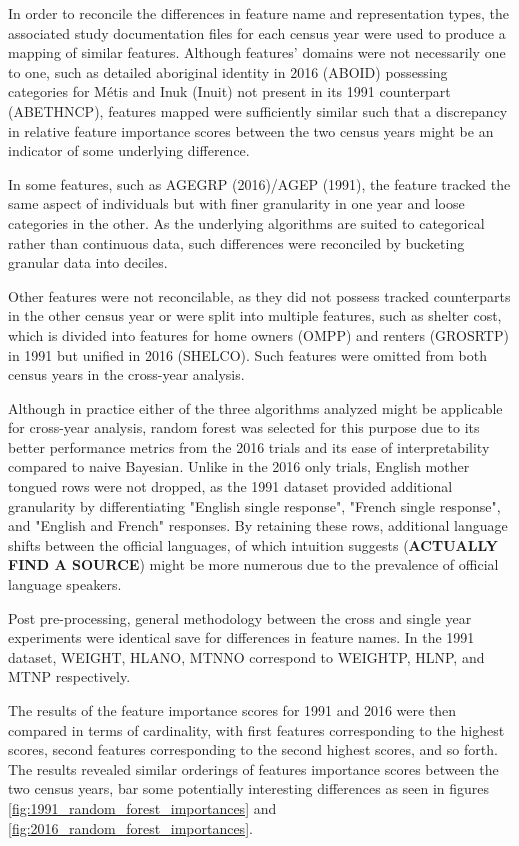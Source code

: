\documentclass[10pt, conference, compsocconf]{IEEEtran}
\begin{document}
In order to reconcile the differences in feature name and representation types, the associated study documentation files for each census year were used to produce a mapping of similar features.  Although features' domains were not necessarily one to one, such as detailed aboriginal identity in 2016 (ABOID) possessing categories for Métis and Inuk (Inuit) not present in its 1991 counterpart (ABETHNCP), features mapped were sufficiently similar such that a discrepancy in relative feature importance scores between the two census years might be an indicator of some underlying difference.

In some features, such as AGEGRP (2016)/AGEP (1991), the feature tracked the same aspect of individuals but with finer granularity in one year and loose categories in the other.  As the underlying algorithms are suited to categorical rather than continuous data, such differences were reconciled by bucketing granular data into deciles.

Other features were not reconcilable, as they did not possess tracked counterparts in the other census year or were split into multiple features, such as shelter cost, which is divided into features for home owners (OMPP) and renters (GROSRTP) in 1991 but unified in 2016 (SHELCO).  Such features were omitted from both census years in the cross-year analysis.

Although in practice either of the three algorithms analyzed might be applicable for cross-year analysis, random forest was selected for this purpose due to its better performance metrics from the 2016 trials and its ease of interpretability compared to naive Bayesian.  Unlike in the 2016 only trials, English mother tongued rows were not dropped, as the 1991 dataset provided additional granularity by differentiating "English single response", "French single response", and "English and French" responses.  By retaining these rows, additional language shifts between the official languages, of which intuition suggests (\textbf{ACTUALLY FIND A SOURCE}) might be more numerous due to the prevalence of official language speakers.

Post pre-processing, general methodology between the cross and single year experiments were identical save for differences in feature names.  In the 1991 dataset, WEIGHT, HLANO, MTNNO correspond to WEIGHTP, HLNP, and MTNP respectively.

The results of the feature importance scores for 1991 and 2016 were then compared in terms of cardinality, with first features corresponding to the highest scores, second features corresponding to the second highest scores, and so forth.  The results revealed similar orderings of features importance scores between the two census years, bar some potentially interesting differences as seen in figures \ref{fig:1991_random_forest_importances} and \ref{fig:2016_random_forest_importances}.
\end{document}
